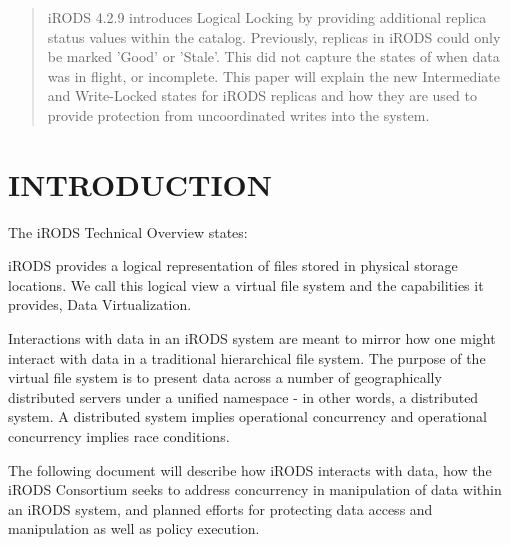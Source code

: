 \documentclass{irodsugm}
\begin{document}

\date{11 June 2021}

\maketitle

\begin{abstract}
iRODS 4.2.9 introduces Logical Locking by providing additional replica status values within the catalog. Previously, replicas in iRODS could only be marked 'Good' or 'Stale'. This did not capture the states of when data was in flight, or incomplete. This paper will explain the new Intermediate and Write-Locked states for iRODS replicas and how they are used to provide protection from uncoordinated writes into the system.
\end{abstract}


\section*{INTRODUCTION}

The iRODS Technical Overview\cite{technicaloverview} states:

\begin{displayquote}
iRODS provides a logical representation of files stored in physical storage locations. We call this logical view a virtual file system and the capabilities it provides, Data Virtualization.
\end{displayquote}

Interactions with data in an iRODS system are meant to mirror how one might interact with data in a traditional hierarchical file system. The purpose of the virtual file system is to present data across a number of geographically distributed servers under a unified namespace - in other words, a distributed system. A distributed system implies operational concurrency and operational concurrency implies race conditions.

The following document will describe how iRODS interacts with data, how the iRODS Consortium seeks to address concurrency in manipulation of data within an iRODS system, and planned efforts for protecting data access and manipulation as well as policy execution.
\end{document}
